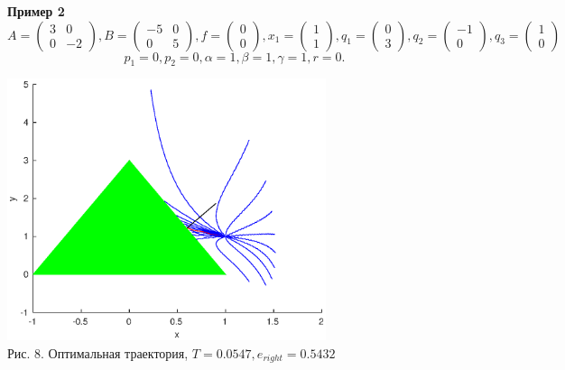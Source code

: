 \documentclass[11pt]{article}
\begin{document}
\newpage

{\vspace*{-2cm} \hspace*{-1cm} \textbf{Пример 2}}
\[A = \begin{pmatrix}
3&0\\
0&-2
\end{pmatrix},
B = \begin{pmatrix}
-5&0\\
0&5
\end{pmatrix},
f = \begin{pmatrix}
0\\
0
\end{pmatrix} ,
x_1 = \begin{pmatrix}
1\\
1
\end{pmatrix},
q_1 = \begin{pmatrix}
0\\
3
\end{pmatrix},
q_2 = \begin{pmatrix}
-1\\
0
\end{pmatrix},
q_3 = \begin{pmatrix}
1\\
0
\end{pmatrix} \]
\[p_1 = 0, p_2 = 0, \alpha = 1,\beta = 1,\gamma = 1, r = 0. \]

\begin{center}
	\includegraphics[width=0.7\textwidth]{pic_8.eps}\\
	{Рис. 8. Оптимальная траектория, $T = 0.0547,e_{right} = 0.5432$}
\end{center}
\end{document}
